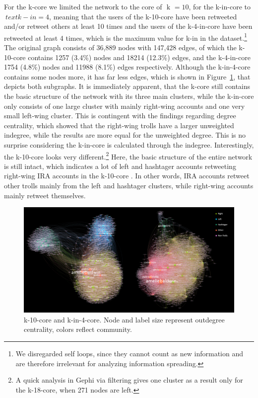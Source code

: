 \documentclass[12pt, titlepage=true, toc=bib]{scrartcl}
\begin{document}
For the k-core we limited the network to the core of \(\text{ k } = 10 \), for the k-in-core to \(\ text{ k-in } = 4\), meaning that the users of the k-10-core have been retweeted and/or retweet others at least 10 times and the users of the k-4-in-core have been retweeted at least 4 times, which is the maximum value for k-in in the dataset.\footnote{We disregarded self loops, since they cannot count as new information and are therefore irrelevant for analyzing information spreading.} The original graph consists of 36,889 nodes with 147,428 edges, of which the k-10-core contains 1257 (3.4\%) nodes and 18214 (12.3\%) edges, and the k-4-in-core 1754 (4.8\%) nodes and 11988 (8.1\%) edges respectively. Although the k-in-4-core contains some nodes more, it has far less edges, which is shown in Figure~\ref{fig:kcore}, that depicts both subgraphs. It is immediately apparent, that the k-core still contains the basic structure of the network with its three main clusters, while the k-in-core only consists of one large cluster with mainly right-wing accounts and one very small left-wing cluster. This is contingent with the findings regarding degree centrality, which showed that the right-wing trolls have a larger unweighted indegree, while the results are more equal for the unweighted degree. This is no surprise considering the k-in-core is calculated through the indegree. Interestingly, the k-10-core looks very different.\footnote{A quick analysis in Gephi via filtering gives one cluster as a result only for the k-18-core, when 271 nodes are left.} Here, the basic structure of the entire network is still intact, which indicates a lot of left and hashtager accounts retweeting right-wing IRA accounts in the k-10-core . In other words, IRA accounts retweet other trolls mainly from the left and hashtager clusters, while right-wing accounts mainly retweet themselves.

\begin{figure}[!ht]
\centering
\includegraphics[width=0.95\linewidth]{final_k_graphs.png}
\caption{k-10-core and k-in-4-core. Node and label size represent outdegree centrality, colors reflect community.}
\label{fig:kcore}
\end{figure}
\end{document}
